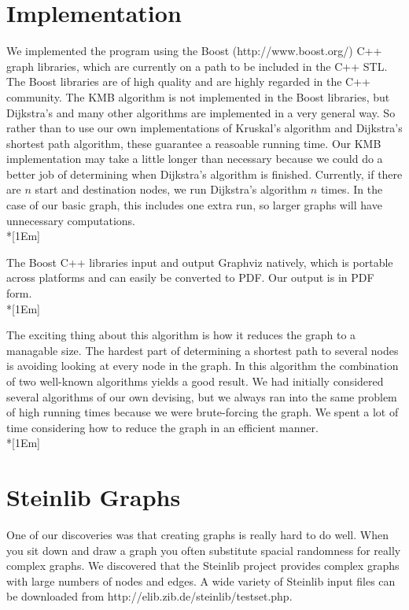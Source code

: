 \documentclass[titlepage,twoside,openright,12pt]{article}
\begin{document}
\begin{raggedright}
\section*{Implementation}
We implemented the program using the Boost (http://www.boost.org/) C++ graph 
libraries, which are currently on a path to be included in the C++ STL. The Boost
libraries are of high quality and are highly regarded in the C++ community. The KMB 
algorithm is not implemented in the Boost libraries, but Dijkstra's and many 
other algorithms are implemented in a very general way. So rather than to use our own 
implementations of Kruskal's algorithm and Dijkstra's shortest path algorithm, 
these guarantee a reasoable running time. Our KMB implementation may take a 
little longer than necessary because we could do a better job of determining 
when Dijkstra's algorithm is finished. Currently, if there are $n$ start and destination 
nodes, we run Dijkstra's algorithm $n$ times. In the case of our basic graph, this includes
one extra run, so larger graphs will have unnecessary computations.\\*[1Em]

The Boost C++ libraries input and output Graphviz natively, which is portable 
across platforms and can easily be converted to PDF. Our output is in PDF form.\\*[1Em]

The exciting thing about this algorithm is how it reduces the graph to a managable
size. The hardest part of determining a shortest path to several nodes is avoiding
looking at every node in the graph. In this algorithm the combination of two well-known 
algorithms yields a good result. We had initially considered several 
algorithms of our own devising, but we always ran into the same problem of high
running times because we were brute-forcing the graph. We spent a lot of time
considering how to reduce the graph in an efficient manner.\\*[1Em]

\section*{Steinlib Graphs}
One of our discoveries was that creating graphs is really hard to do well. When 
you sit down and draw a graph you often substitute spacial randomness for really
complex graphs. We discovered that the Steinlib project provides complex graphs
with large numbers of nodes and edges. A wide variety of Steinlib input files 
can be downloaded from http://elib.zib.de/steinlib/testset.php.


\end{raggedright}
\end{document}
